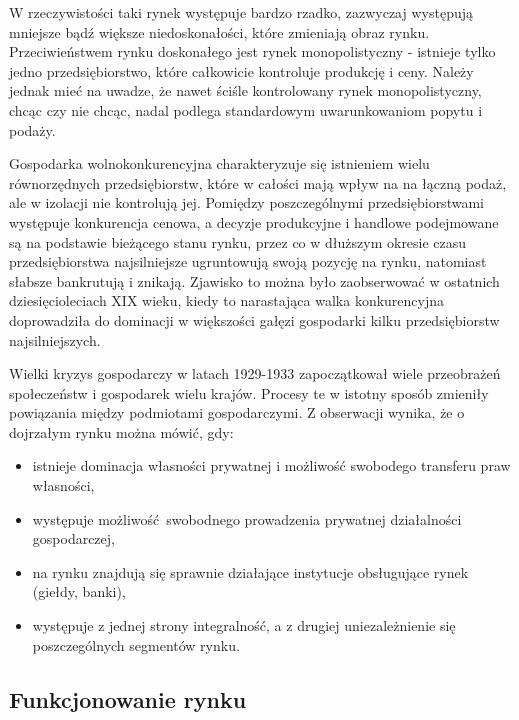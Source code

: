\documentclass[12pt]{extarticle}
\begin{document}
W rzeczywistości taki rynek występuje bardzo rzadko, zazwyczaj występują mniejsze bądź większe niedoskonałości, które zmieniają obraz rynku. Przeciwieństwem rynku doskonałego jest rynek monopolistyczny - istnieje tylko jedno przedsiębiorstwo, które całkowicie kontroluje produkcję i ceny. Należy jednak mieć na uwadze, że nawet ściśle kontrolowany rynek monopolistyczny, chcąc czy nie chcąc, nadal podlega standardowym uwarunkowaniom popytu i podaży.

Gospodarka wolnokonkurencyjna charakteryzuje się istnieniem wielu równorzędnych przedsiębiorstw, które w całości mają wpływ na na łączną podaż, ale w izolacji nie kontrolują jej. Pomiędzy poszczególnymi przedsiębiorstwami występuje konkurencja cenowa, a decyzje produkcyjne i handlowe podejmowane są na podstawie bieżącego stanu rynku, przez co w dłuższym okresie czasu przedsiębiorstwa najsilniejsze ugruntowują swoją pozycję na rynku, natomiast słabsze bankrutują i znikają. Zjawisko to można było zaobserwować w ostatnich dziesięcioleciach XIX wieku, kiedy to narastająca walka konkurencyjna doprowadziła do dominacji w większości gałęzi gospodarki kilku przedsiębiorstw najsilniejszych.

Wielki kryzys gospodarczy w latach 1929-1933 zapoczątkował wiele przeobrażeń społeczeństw i gospodarek wielu krajów. Procesy te w istotny sposób zmieniły powiązania między podmiotami gospodarczymi. Z obserwacji wynika, że o dojrzałym rynku można mówić, gdy:

\begin{itemize}
	\item istnieje dominacja własności prywatnej i możliwość swobodego transferu praw własności,
	\item występuje możliwość swobodnego prowadzenia prywatnej działalności gospodarczej,
    \item na rynku znajdują się sprawnie działające instytucje obsługujące rynek (giełdy, banki),
    \item występuje z jednej strony integralność, a z drugiej uniezależnienie się poszczególnych segmentów rynku.
\end{itemize}


\subsection{Funkcjonowanie rynku}
\end{document}
